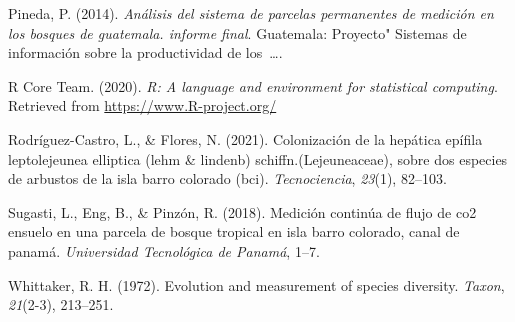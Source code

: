 \documentclass[11pt,]{article}
\begin{document}
\hypertarget{ref-pineda2014analisis}{}
Pineda, P. (2014). \emph{Análisis del sistema de parcelas permanentes de
medición en los bosques de guatemala. informe final}. Guatemala:
Proyecto" Sistemas de información sobre la productividad de
los~\ldots{}.

\hypertarget{ref-R2020ALanguage}{}
R Core Team. (2020). \emph{R: A language and environment for statistical
computing}. Retrieved from \url{https://www.R-project.org/}

\hypertarget{ref-rodriguez2021colonizacion}{}
Rodríguez-Castro, L., \& Flores, N. (2021). Colonización de la hepática
epífila leptolejeunea elliptica (lehm \& lindenb)
schiffn.(Lejeuneaceae), sobre dos especies de arbustos de la isla barro
colorado (bci). \emph{Tecnociencia}, \emph{23}(1), 82--103.

\hypertarget{ref-sugasti2018medicion}{}
Sugasti, L., Eng, B., \& Pinzón, R. (2018). Medición continúa de flujo
de co2 ensuelo en una parcela de bosque tropical en isla barro colorado,
canal de panamá. \emph{Universidad Tecnológica de Panamá}, 1--7.

\hypertarget{ref-whittaker1972evolution}{}
Whittaker, R. H. (1972). Evolution and measurement of species diversity.
\emph{Taxon}, \emph{21}(2-3), 213--251.




\newpage
\singlespacing 
\end{document}
